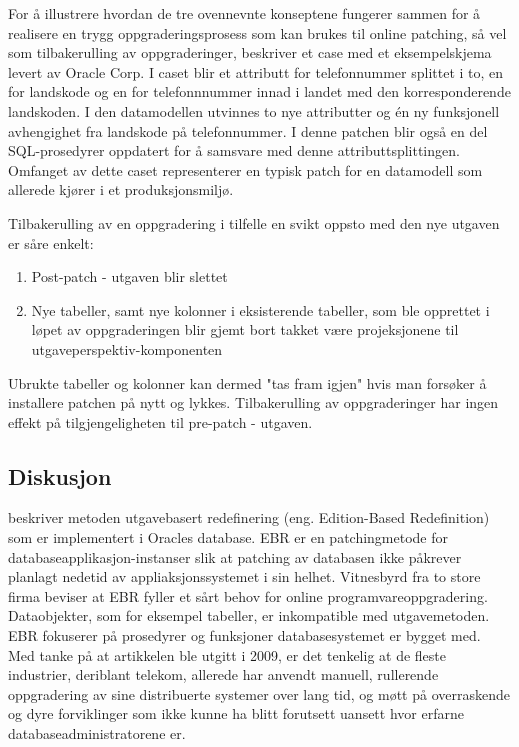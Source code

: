 For å illustrere hvordan de tre ovennevnte konseptene fungerer sammen for å realisere en trygg oppgraderingsprosess som kan brukes til online patching, så vel som tilbakerulling av oppgraderinger, beskriver \cite{choi2009} et case med et eksempelskjema levert av Oracle Corp. I caset blir et attributt for telefonnummer splittet i to, en for landskode og en for telefonnnummer innad i landet med den korresponderende landskoden. I den datamodellen utvinnes to nye attributter og én ny funksjonell avhengighet fra landskode på telefonnummer. I denne patchen blir også en del SQL-prosedyrer oppdatert for å samsvare med denne attributtsplittingen. Omfanget av dette caset representerer en typisk patch for en datamodell som allerede kjører i et produksjonsmiljø.

Tilbakerulling av en oppgradering i tilfelle en svikt oppsto med den nye utgaven er såre enkelt:
\begin{enumerate}
  \item Post-patch - utgaven blir slettet
  \item Nye tabeller, samt nye kolonner i eksisterende tabeller, som ble opprettet i løpet av oppgraderingen blir gjemt bort takket være projeksjonene til utgaveperspektiv-komponenten
\end{enumerate}

Ubrukte tabeller og kolonner kan dermed "tas fram igjen" \citep{choi2009} hvis man forsøker å installere patchen på nytt og lykkes. Tilbakerulling av oppgraderinger har ingen effekt på tilgjengeligheten til pre-patch - utgaven.

\subsection{Diskusjon}
\cite{choi2009} beskriver metoden utgavebasert redefinering (eng. Edition-Based Redefinition) som er implementert i Oracles database. EBR er en patchingmetode for databaseapplikasjon-instanser slik at patching av databasen ikke påkrever planlagt nedetid av appliaksjonssystemet i sin helhet. Vitnesbyrd fra to store firma beviser at EBR fyller et sårt behov for online programvareoppgradering. Dataobjekter, som for eksempel tabeller, er inkompatible med utgavemetoden. EBR fokuserer på prosedyrer og funksjoner databasesystemet er bygget med. Med tanke på at artikkelen ble utgitt i 2009, er det tenkelig at de fleste industrier, deriblant telekom, allerede har anvendt manuell, rullerende oppgradering av sine distribuerte systemer over lang tid, og møtt på overraskende og dyre forviklinger som ikke kunne ha blitt forutsett uansett hvor erfarne databaseadministratorene er.

